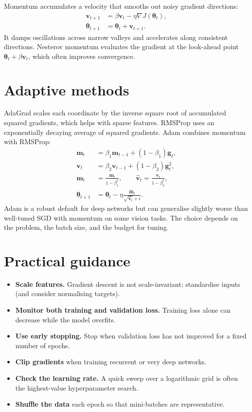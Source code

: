 \documentclass[a4paper, 12pt]{book}
\begin{document}
Momentum accumulates a velocity that smooths out noisy gradient directions:
\begin{align}
    \mathbf{v}_{t+1} &= \beta\mathbf{v}_t - \eta\nabla J(\boldsymbol{\theta}_t),\\
    \boldsymbol{\theta}_{t+1} &= \boldsymbol{\theta}_t + \mathbf{v}_{t+1}.
\end{align}
It damps oscillations across narrow valleys and accelerates along consistent
directions. Nesterov momentum evaluates the gradient at the look-ahead point
$\boldsymbol{\theta}_t + \beta\mathbf{v}_t$, which often improves convergence.

\section{Adaptive methods}

AdaGrad scales each coordinate by the inverse square root of accumulated squared
gradients, which helps with sparse features. RMSProp uses an exponentially decaying
average of squared gradients. Adam combines momentum with RMSProp:
\begin{align}
    \mathbf{m}_t &= \beta_1\mathbf{m}_{t-1} + (1-\beta_1)\mathbf{g}_t,\\
    \mathbf{v}_t &= \beta_2\mathbf{v}_{t-1} + (1-\beta_2)\mathbf{g}_t^2,\\
    \hat{\mathbf{m}}_t &= \frac{\mathbf{m}_t}{1-\beta_1^t}, \qquad
    \hat{\mathbf{v}}_t = \frac{\mathbf{v}_t}{1-\beta_2^t},\\
    \boldsymbol{\theta}_{t+1} &= \boldsymbol{\theta}_t
    - \eta\frac{\hat{\mathbf{m}}_t}{\sqrt{\hat{\mathbf{v}}_t}+\epsilon}.
\end{align}
Adam is a robust default for deep networks but can generalise slightly worse than
well-tuned SGD with momentum on some vision tasks. The choice depends on the problem,
the batch size, and the budget for tuning.

\section{Practical guidance}

\begin{itemize}
    \item \textbf{Scale features.} Gradient descent is not scale-invariant; standardise
    inputs (and consider normalising targets).
    \item \textbf{Monitor both training and validation loss.} Training loss alone can
    decrease while the model overfits.
    \item \textbf{Use early stopping.} Stop when validation loss has not improved for a
    fixed number of epochs.
    \item \textbf{Clip gradients} when training recurrent or very deep networks.
    \item \textbf{Check the learning rate.} A quick sweep over a logarithmic grid is
    often the highest-value hyperparameter search.
    \item \textbf{Shuffle the data} each epoch so that mini-batches are representative.
\end{itemize}
\end{document}
